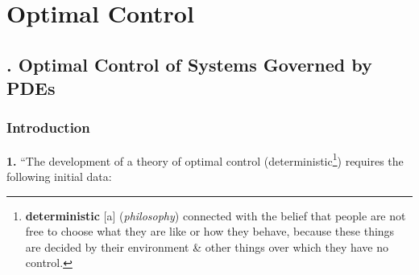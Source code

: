 \documentclass[oneside]{book}
\numberwithin{equation}{section}
\begin{document}

\part{Optimal Control}

\chapter{\cite{Lions1971}. Optimal Control of Systems Governed by PDEs}

\section*{Introduction}
\textbf{1.} ``The development of a theory of optimal control (deterministic\footnote{\textbf{deterministic} [a] (\textit{philosophy}) connected with the belief that people are not free to choose what they are like or how they behave, because these things are decided by their environment \& other things over which they have no control.}) requires the following initial data:
\end{document}
